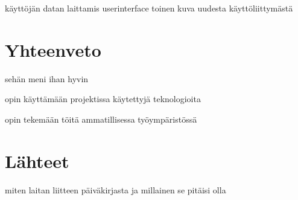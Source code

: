 \documentclass[11pt,a4paper,titlepage,oneside]{article}
\begin{document}
käyttöjän datan laittamis userinterface
toinen kuva uudesta käyttöliittymästä








\newpage
\section{Yhteenveto}

sehän meni ihan hyvin 

opin käyttämään projektissa käytettyjä teknologioita

opin tekemään töitä ammatillisessa työympäristössä




\newpage
\section{Lähteet}               %

miten laitan liitteen päiväkirjasta ja millainen se pitäisi olla
\end{document}
